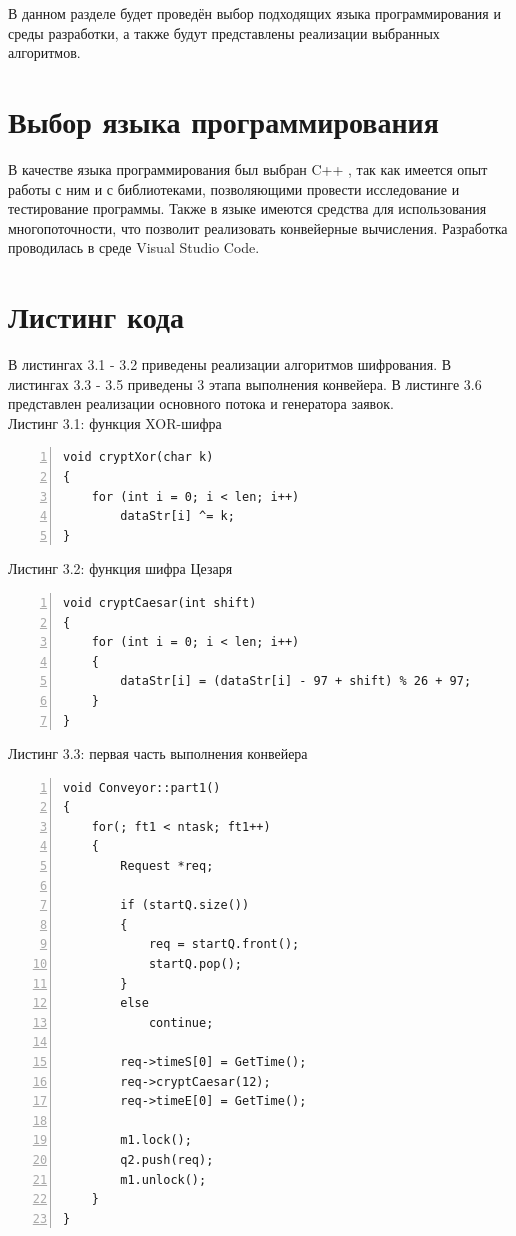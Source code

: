 \documentclass[12pt,a4paper]{report}
\begin{document}
В данном разделе будет проведён выбор подходящих языка программирования и среды разработки, а также 
будут представлены реализации выбранных алгоритмов.

\section{Выбор языка программирования}

В качестве языка программирования был выбран C++ \cite{cpp_info}, так как имеется опыт работы с ним и с библиотеками, 
позволяющими провести исследование и тестирование программы. 
Также в языке имеются средства для использования многопоточности, что позволит реализовать 
конвейерные вычисления. 
Разработка проводилась в среде Visual Studio Code.

\section{Листинг кода}

В листингах 3.1 - 3.2 приведены реализации алгоритмов шифрования.
В листингах 3.3 - 3.5 приведены 3 этапа выполнения конвейера. 
В листинге 3.6 представлен реализации основного потока и генератора заявок.\\

\textrm{Листинг 3.1: функция XOR-шифра}
\begin{lstlisting}[frame=single, numbers=left]
void cryptXor(char k)
{
    for (int i = 0; i < len; i++)
        dataStr[i] ^= k;
}
\end{lstlisting}

\textrm{Листинг 3.2: функция шифра Цезаря}
\begin{lstlisting}[frame=single, numbers=left]
void cryptCaesar(int shift)
{
    for (int i = 0; i < len; i++)
    {
        dataStr[i] = (dataStr[i] - 97 + shift) % 26 + 97;
    }
}
\end{lstlisting}

\newpage
\textrm{Листинг 3.3: первая часть выполнения конвейера}
\begin{lstlisting}[frame=single, numbers=left]
void Conveyor::part1()
{
    for(; ft1 < ntask; ft1++)
    {
        Request *req;
    
        if (startQ.size())
        {
            req = startQ.front();
            startQ.pop();
        }
        else
            continue;
    
        req->timeS[0] = GetTime();
        req->cryptCaesar(12);
        req->timeE[0] = GetTime();
    
        m1.lock();
        q2.push(req);
        m1.unlock();
    }
}
\end{lstlisting}
\end{document}

